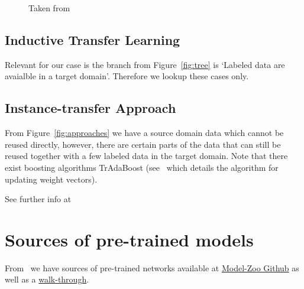 \documentclass[11pt]{article}
\begin{document}
\begin{figure}[H]


    \caption{Taken from~\cite{survey-on-transfer-learning}}
\end{figure}    

\subsection{Inductive Transfer Learning}

Relevant for our case is the branch from Figure~\ref{fig:tree} is `Labeled data are avaialble in a target domain'. Therefore we lookup these cases only.

\subsection{Instance-transfer Approach}

From Figure~\ref{fig:approaches} we have a source domain data which cannot be reused directly, however, there are certain parts of the data that can still be reused together with a few labeled data in the target domain. Note that there exist boosting algorithms TrAdaBoost (see~\cite{transfer-learning-boosting} which details the algorithm for updating weight vectors).

\vspace{1em}

See further info at~\cite{survey-on-transfer-learning}

\section{Sources of pre-trained models}

From~\cite{gentle-introduction-to-transfer-learning} we have sources of pre-trained networks available at \href{https://github.com/BVLC/caffe/wiki/Model-Zoo}{Model-Zoo Github} as well as a \href{https://machinelearningmastery.com/how-to-use-transfer-learning-when-developing-convolutional-neural-network-models/}{walk-through}.

\printbibliography
\end{document}
